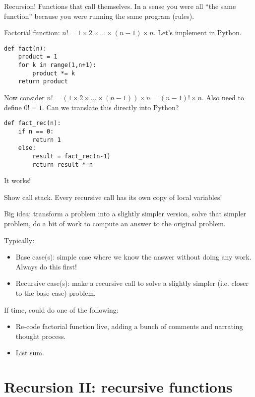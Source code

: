 \documentclass{article}
\begin{document}
Recursion!  Functions that call themselves.  In a sense you were all
``the same function'' because you were running the same program
(rules).

Factorial function: $n! = 1 \times 2 \times \dots \times (n-1) \times
n$.  Let's implement in Python.
\begin{verbatim}
def fact(n):
    product = 1
    for k in range(1,n+1):
        product *= k
    return product
\end{verbatim}
Now consider $n! = (1 \times 2 \times \dots \times (n-1)) \times n =
(n-1)! \times n$.  Also need to define $0! = 1$.  Can we translate
this directly into Python?
\begin{verbatim}
def fact_rec(n):
    if n == 0:
        return 1
    else:
        result = fact_rec(n-1)
        return result * n
\end{verbatim}
It works!

Show call stack.  Every recursive call has its own copy of local
variables!

Big idea: transform a problem into a slightly simpler version, solve
that simpler problem, do a bit of work to compute an answer to the
original problem.

Typically:
\begin{itemize}
\item Base case(s): simple case where we know the answer without doing
  any work.  Always do this first!
\item Recursive case(s): make a recursive call to solve a slightly
  simpler (i.e. closer to the base case) problem.
\end{itemize}

If time, could do one of the following:
\begin{itemize}
\item Re-code factorial function live, adding a bunch of comments and
  narrating thought process.
\item List sum.
\end{itemize}



\section{Recursion II: recursive functions}
\end{document}
